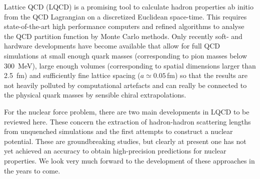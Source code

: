 \documentclass[aps,rmp,nofootinbib,twocolumn,floatfix]{revtex4}
\begin{document}
Lattice QCD (LQCD) is a promising tool to calculate hadron properties ab
initio from the QCD Lagrangian on a discretized Euclidean space-time.
This requires state-of-the-art high performance computers and refined
algorithms to analyse the QCD partition function by Monte Carlo methods.
Only recently soft- and hardware developments have become available
that allow for full QCD simulations at small enough quark masses
(corresponding to pion masses below 300~MeV), large enough volumes
(corresponding to spatial dimensions larger than 2.5~fm) and
sufficiently fine lattice spacing ($a \simeq 0.05\,$fm) so that the
results are not heavily polluted by computational artefacts and
can really be connected to the physical quark masses by sensible
chiral extrapolations.

For the nuclear force problem, there are two main developments
in LQCD to be reviewed here. These concern the extraction of hadron-hadron
scattering lengths from unquenched simulations and the first attempts
to construct a nuclear potential. These are groundbreaking studies,
but clearly at present one has not yet achieved an accuracy to obtain
high-precision predictions for nuclear properties. We look very much 
forward to the development of these approaches in the years to come.
\end{document}
